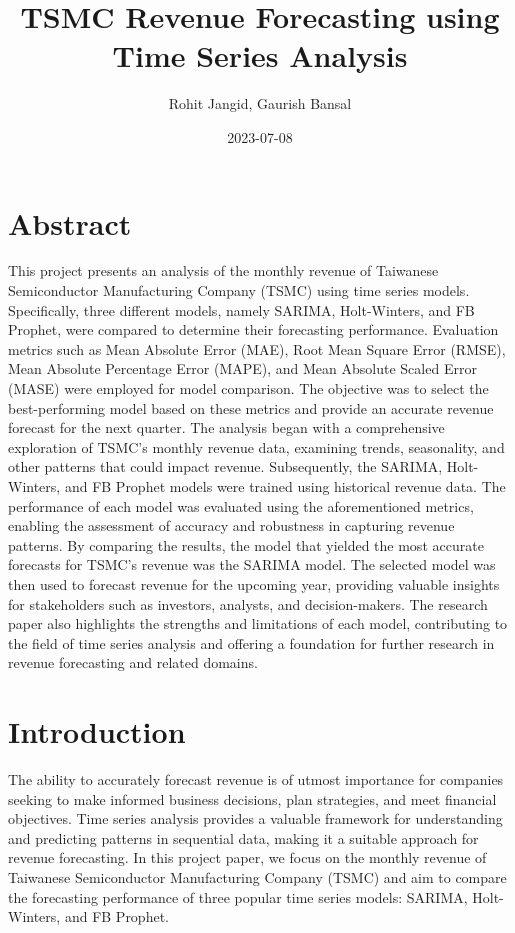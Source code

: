 \documentclass[
]{article}
\title{TSMC Revenue Forecasting using Time Series Analysis}
\author{Rohit Jangid, Gaurish Bansal}
\date{2023-07-08}
\begin{document}
\maketitle

{
\setcounter{tocdepth}{2}
\tableofcontents
}
\hypertarget{abstract}{%
\section{Abstract}\label{abstract}}

This project presents an analysis of the monthly revenue of Taiwanese
Semiconductor Manufacturing Company (TSMC) using time series models.
Specifically, three different models, namely SARIMA, Holt-Winters, and
FB Prophet, were compared to determine their forecasting performance.
Evaluation metrics such as Mean Absolute Error (MAE), Root Mean Square
Error (RMSE), Mean Absolute Percentage Error (MAPE), and Mean Absolute
Scaled Error (MASE) were employed for model comparison. The objective
was to select the best-performing model based on these metrics and
provide an accurate revenue forecast for the next quarter. The analysis
began with a comprehensive exploration of TSMC's monthly revenue data,
examining trends, seasonality, and other patterns that could impact
revenue. Subsequently, the SARIMA, Holt-Winters, and FB Prophet models
were trained using historical revenue data. The performance of each
model was evaluated using the aforementioned metrics, enabling the
assessment of accuracy and robustness in capturing revenue patterns. By
comparing the results, the model that yielded the most accurate
forecasts for TSMC's revenue was the SARIMA model. The selected model
was then used to forecast revenue for the upcoming year, providing
valuable insights for stakeholders such as investors, analysts, and
decision-makers. The research paper also highlights the strengths and
limitations of each model, contributing to the field of time series
analysis and offering a foundation for further research in revenue
forecasting and related domains.

\hypertarget{introduction}{%
\section{Introduction}\label{introduction}}

The ability to accurately forecast revenue is of utmost importance for
companies seeking to make informed business decisions, plan strategies,
and meet financial objectives. Time series analysis provides a valuable
framework for understanding and predicting patterns in sequential data,
making it a suitable approach for revenue forecasting. In this project
paper, we focus on the monthly revenue of Taiwanese Semiconductor
Manufacturing Company (TSMC) and aim to compare the forecasting
performance of three popular time series models: SARIMA, Holt-Winters,
and FB Prophet.
\end{document}
